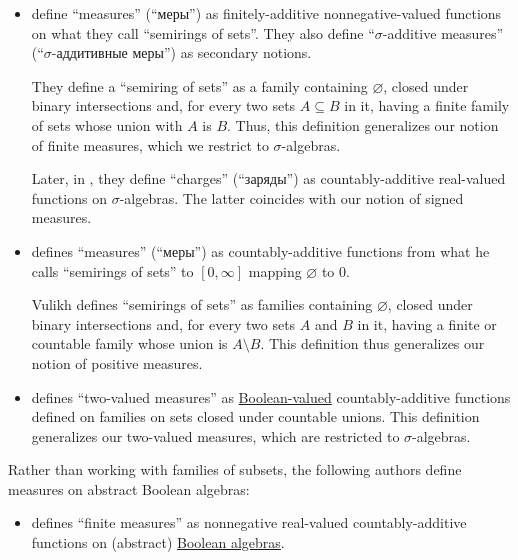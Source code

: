 \begin{remark}
\begin{itemize}
    \item {} define \enquote{measures} (\enquote{меры}) as finitely-additive nonnegative-valued functions on what they call \enquote{semirings of sets}. They also define \enquote{\( \sigma \)-additive measures} (\enquote{\( \sigma \)-аддитивные меры}) as secondary notions.

    They define a \enquote{semiring of sets} as a family containing \( \varnothing \), closed under binary intersections and, for every two sets \( A \subseteq B \) in it, having a finite family of sets whose union with \( A \) is \( B \). Thus, this definition generalizes our notion of finite measures, which we restrict to \( \sigma \)-algebras.

    Later, in \cite[def. 20.1]{ДьяченкоУльянов1998ТеорияМеры}, they define \enquote{charges} (\enquote{заряды}) as countably-additive real-valued functions on \( \sigma \)-algebras. The latter coincides with our notion of signed measures.

    \item {} defines \enquote{measures} (\enquote{меры}) as countably-additive functions from what he calls \enquote{semirings of sets} to \( [0, \infty] \) mapping \( \varnothing \) to \( 0 \).

    Vulikh defines \enquote{semirings of sets} as families containing \( \varnothing \), closed under binary intersections and, for every two sets \( A \) and \( B \) in it, having a finite or countable family whose union is \( A \setminus B \). This definition thus generalizes our notion of positive measures.

    \item {} defines \enquote{two-valued measures} as \hyperref[def:boolean_function]{Boolean-valued} countably-additive functions defined on families on sets closed under countable unions. This definition generalizes our two-valued measures, which are restricted to \( \sigma \)-algebras.
  \end{itemize}

  Rather than working with families of subsets, the following authors define measures on abstract Boolean algebras:
  \begin{itemize}
    \item {} defines \enquote{finite measures} as nonnegative real-valued countably-additive functions on (abstract) \hyperref[def:boolean_algebra]{Boolean algebras}.


\end{itemize}
\end{remark}
